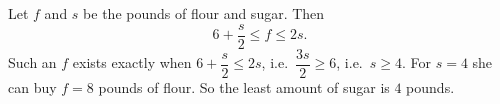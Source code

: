 Let $f$ and $s$ be the pounds of flour and sugar. Then
\[
6+\dfrac {s}{2}\le f\le2s .
\]
Such an $f$ exists exactly when $6+\dfrac {s}{2}\le2s$, i.e.\ $\dfrac{3s}{2}\ge6$, i.e.\ $s\ge4$. For $s=4$ she can buy $f=8$ pounds of flour. So the least amount of sugar is $\boxed{4}$ pounds.
